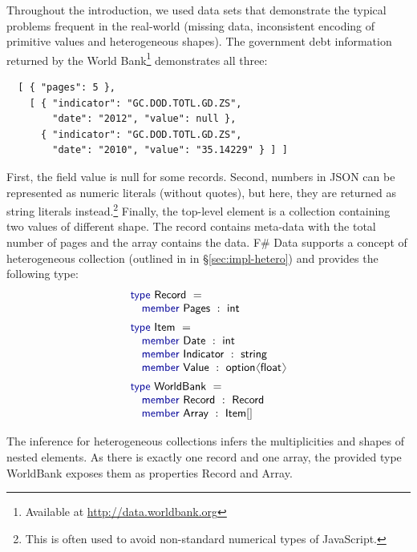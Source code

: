 \documentclass[10pt]{sigplanconf}
\newcommand{\langl}{\begin{picture}(4.5,7)
\put(1.1,2.5){\rotatebox{60}{\line(1,0){5.5}}}
\put(1.1,2.5){\rotatebox{300}{\line(1,0){5.5}}}
\end{picture}}
\newcommand{\rangl}{\begin{picture}(4.5,7)
\put(.9,2.5){\rotatebox{120}{\line(1,0){5.5}}}
\put(.9,2.5){\rotatebox{240}{\line(1,0){5.5}}}
\end{picture}}
\newcommand{\kvd}[1]{\textnormal{\textcolor{kvdclr}{\sffamily #1}}}
\newcommand{\ident}[1]{\textnormal{\sffamily #1}}
\begin{document}
Throughout the introduction, we used data sets that demonstrate the typical problems frequent
in the real-world (missing data, inconsistent encoding of primitive values and heterogeneous shapes). 
The government debt information returned by the World Bank\footnote{Available at 
\url{http://data.worldbank.org}} demonstrates all three:
%
{\small{
\begin{verbatim}
  [ { "pages": 5 },
    [ { "indicator": "GC.DOD.TOTL.GD.ZS",
        "date": "2012", "value": null },
      { "indicator": "GC.DOD.TOTL.GD.ZS",
        "date": "2010", "value": "35.14229" } ] ]
\end{verbatim}
}}
%
\noindent
First, the field \ident{value} is \kvd{null} for some records. Second, numbers in JSON can be 
represented as numeric literals (without quotes), but here, they are returned as string literals 
instead.\footnote{This is often used to avoid non-standard numerical types of JavaScript.}
Finally, the top-level element is a collection containing two values of different shape.
The record contains meta-data with the total number of pages and the array contains the data.
F\# Data supports a concept of heterogeneous collection (outlined in in \S\ref{sec:impl-hetero})
and provides the following type:
%
\begin{equation*}
\begin{array}{l}
\kvd{type}~\ident{Record}~=  \\
 \quad \kvd{member}~\ident{Pages}~:~\ident{int} \\[0.5em]
\kvd{type}~\ident{Item}~=  \\
 \quad \kvd{member}~\ident{Date}~:~\ident{int} \\
 \quad \kvd{member}~\ident{Indicator}~:~\ident{string} \\
 \quad \kvd{member}~\ident{Value}~:~\ident{option}\langl \ident{float}\rangl\\[0.5em]
\kvd{type}~\ident{WorldBank}~=  \\
 \quad \kvd{member}~\ident{Record}~:~\ident{Record}\\
 \quad \kvd{member}~\ident{Array}~:~\ident{Item}[]\\[0.5em]
\end{array}
\end{equation*}
%
The inference for heterogeneous collections infers the multiplicities and shapes of nested 
elements. As there is exactly one record and one array, the provided type \ident{WorldBank} exposes 
them as properties \ident{Record} and \ident{Array}. 
\end{document}
